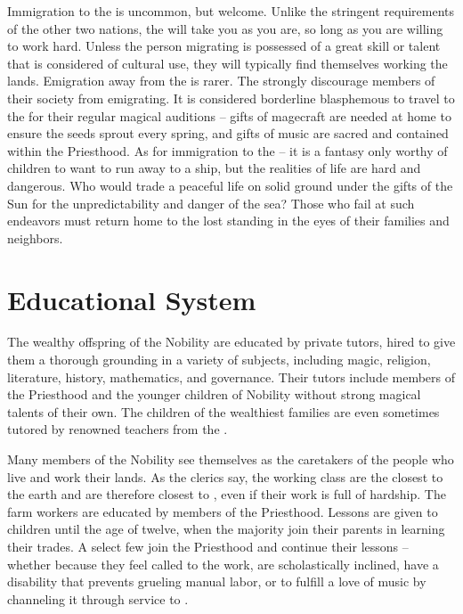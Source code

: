 \documentclass[blue]{GL2020}
\begin{document}
Immigration to the \pFarm{} is uncommon, but welcome.  Unlike the stringent requirements of the other two nations, the \pFarm{} will take you as you are, so long as you are willing to work hard.  Unless the person migrating is possessed of a great skill or talent that is considered of cultural use, they will typically find themselves working the lands.  Emigration away from the \pFarm{} is rarer.  The \pFarmers{} strongly discourage members of their society from emigrating. It is considered borderline blasphemous to travel to the \pTech{} for their regular magical auditions -- gifts of magecraft are needed at home to ensure the seeds sprout every spring, and gifts of music are sacred and contained within the Priesthood.  As for immigration to the \pShip{} -- it is a fantasy only worthy of children to want to run away to a \pShippie{} ship, but the realities of \pShip{} life are hard and dangerous. Who would trade a peaceful life on solid ground under the gifts of the Sun for the unpredictability and danger of the sea?  Those who fail at such endeavors must return home to the lost standing in the eyes of their families and neighbors.

\section*{Educational System}
The wealthy offspring of the Nobility are educated by private tutors, hired to give them a thorough grounding in a variety of subjects, including magic, religion, literature, history, mathematics, and governance.  Their tutors include members of the Priesthood and the younger children of Nobility without strong magical talents of their own.  The children of the wealthiest families are even sometimes tutored by renowned teachers from the \pTech{}.

Many members of the Nobility see themselves as the caretakers of the people who live and work their lands.  As the clerics say, the working class are the closest to the earth and are therefore closest to \cFarmGod{}, even if their work is full of hardship.  The farm workers are educated by members of the Priesthood.  Lessons are given to children until the age of twelve, when the majority join their parents in learning their trades.  A select few join the Priesthood and continue their lessons -- whether because they feel called to the work, are scholastically inclined, have a disability that prevents grueling manual labor, or to fulfill a love of music by channeling it through service to \cFarmGod{}.
\end{document}
